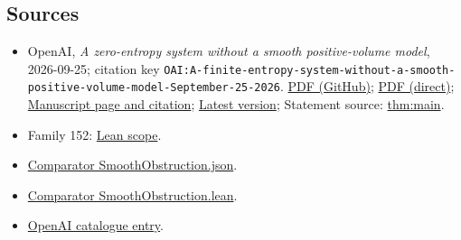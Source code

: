 \documentclass[11pt]{article}
\begin{document}
\subsection{Sources}
\begin{itemize}
\item OpenAI, \emph{A zero-entropy system without a smooth positive-volume model}, 2026-09-25; citation key \texttt{OAI:A-finite-entropy-system-without-a-smooth-positive-volume-model-September-25-2026}. \href{https://github.com/openai/math/blob/adc7f1241b42e322a6451854ab7e4b4c146bf78a/preprints/A-finite-entropy-system-without-a-smooth-positive-volume-model-September-25-2026/paper.pdf}{PDF (GitHub)}; \href{https://github.com/openai/math/raw/adc7f1241b42e322a6451854ab7e4b4c146bf78a/preprints/A-finite-entropy-system-without-a-smooth-positive-volume-model-September-25-2026/paper.pdf}{PDF (direct)}; \href{https://github.com/openai/math/blob/adc7f1241b42e322a6451854ab7e4b4c146bf78a/preprints/A-finite-entropy-system-without-a-smooth-positive-volume-model-September-25-2026/README.md}{Manuscript page and citation}; \href{https://github.com/openai/math/blob/main/preprints/A-finite-entropy-system-without-a-smooth-positive-volume-model-September-25-2026/paper.pdf}{Latest version}; Statement source: \href{https://github.com/openai/math/blob/adc7f1241b42e322a6451854ab7e4b4c146bf78a/preprints/A-finite-entropy-system-without-a-smooth-positive-volume-model-September-25-2026/build/sections/01-introduction.tex\#L91}{thm:main}.
\item Family 152: \href{https://github.com/openai/math/blob/adc7f1241b42e322a6451854ab7e4b4c146bf78a/lean/docs/152.md}{Lean scope}.
\item \href{https://github.com/openai/math/blob/adc7f1241b42e322a6451854ab7e4b4c146bf78a/lean/ComparatorChallenges/SmoothObstruction.json}{Comparator SmoothObstruction.json}.
\item \href{https://github.com/openai/math/blob/adc7f1241b42e322a6451854ab7e4b4c146bf78a/lean/ComparatorChallenges/SmoothObstruction.lean}{Comparator SmoothObstruction.lean}.
\item \href{https://github.com/openai/math/blob/adc7f1241b42e322a6451854ab7e4b4c146bf78a/CONTENTS.md}{OpenAI catalogue entry}.
\end{itemize}
\end{document}
